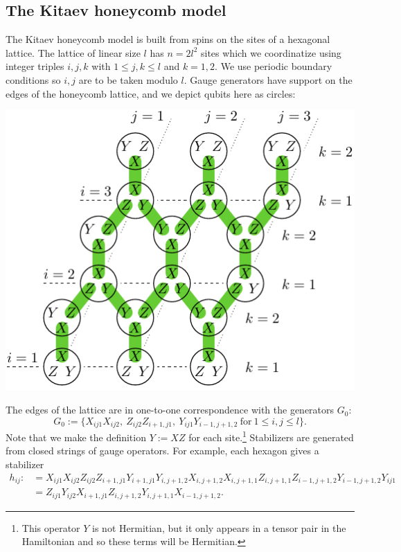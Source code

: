 \subsection{The Kitaev honeycomb model}




The Kitaev honeycomb model \cite{Kitaev2006} is built from spins on
the sites of a hexagonal lattice. 
The lattice of linear size $l$ has $n=2l^2$ sites
which we coordinatize using integer triples $i, j, k$
with $1\le j, k\le l$ and $k=1, 2.$
We use periodic boundary conditions so $i, j$ are
to be taken modulo $l$.
Gauge generators have support on the edges of the honeycomb lattice,
and we depict qubits here as circles:
\begin{center}
\includegraphics[width=0.6\columnwidth]{fig_00.pdf}
\end{center}
The edges of the lattice are in one-to-one
correspondence with the generators $G_0$:
$$
G_0 := \big\{X_{ij1}X_{ij2},\ Z_{ij2}Z_{i+1,j1},\ Y_{ij1}Y_{i-1,j+1,2}
\ \mbox{for}\ 1\le i,j\le l\big\}.
$$
Note that we make the definition $Y:=XZ$ for each site.\footnote{
This operator $Y$ is not Hermitian, but it only appears in a tensor pair in
the Hamiltonian and so these terms will be Hermitian.}
Stabilizers are generated from closed strings of
gauge operators. 
For example, each hexagon gives a stabilizer
\begin{align*}
h_{ij}:&= 
X_{ij1}X_{ij2}
Z_{ij2}Z_{i+1,j1}
Y_{i+1,j1}Y_{i,j+1,2}
X_{i,j+1,2}X_{i,j+1,1}
Z_{i,j+1,1}Z_{i-1,j+1,2}
Y_{i-1,j+1,2}Y_{ij1}
\\
&= 
Z_{ij1} Y_{ij2} X_{i+1,j1}
Z_{i,j+1,2} Y_{i,j+1,1} X_{i-1,j+1,2}.
\end{align*}

